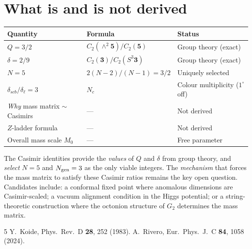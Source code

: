 \documentclass[11pt]{article}
\begin{document}
\section{What is and is not derived}

\begin{center}\small
\begin{tabular}{@{}l l l@{}}
\toprule
Quantity & Formula & Status \\
\midrule
$Q = 3/2$ & $C_2(\wedge^2\!\mathbf{5})/C_2(\mathbf{5})$
  & Group theory (exact) \\
$\delta = 2/9$ & $C_2(\mathbf{3})/C_2(S^3\!\mathbf{3})$
  & Group theory (exact) \\
$N = 5$ & $2(N-2)/(N-1) = 3/2$ & Uniquely selected \\
$\delta_{scb}/\delta_\ell = 3$ & $N_c$
  & Colour multiplicity ($1^\circ$ off) \\
\midrule
\emph{Why} mass matrix $\sim$ Casimirs & --- & Not derived \\
$Z$-ladder formula & --- & Not derived \\
Overall mass scale $M_0$ & --- & Free parameter \\
\bottomrule
\end{tabular}
\end{center}

\noindent
The Casimir identities provide the \emph{values} of $Q$ and
$\delta$ from group theory, and \emph{select} $N=5$ and
$N_{\rm gen}=3$ as the only viable integers.  The
\emph{mechanism} that forces the mass matrix to satisfy these
Casimir ratios remains the key open question.  Candidates
include: a conformal fixed point where anomalous dimensions are
Casimir-scaled; a vacuum alignment condition in the Higgs
potential; or a string-theoretic construction where the
octonion structure of $G_2$ determines the mass matrix.

\begin{thebibliography}{5}
Y.~Koide, Phys.\ Rev.\ D \textbf{28}, 252 (1983).
A.~Rivero, Eur.\ Phys.\ J.\ C \textbf{84}, 1058 (2024).
\end{thebibliography}
\end{document}
